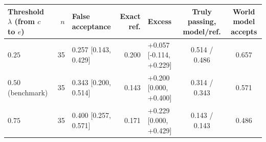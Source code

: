 \setlength{\tabcolsep}{3pt}
\begin{tabular*}{\textwidth}{@{\extracolsep{\fill}}lrlrlcc@{}}
\toprule
Threshold $\lambda$ (from $c$ to $e$) & $n$ & False acceptance & Exact ref. & Excess & Truly passing, model/ref. & World model accepts \\
\midrule
$0.25$ & 35 & 0.257 {\tiny[0.143, 0.429]} & 0.200 & +0.057 {\tiny[\mbox{-}0.114, +0.229]} & 0.514 / 0.486 & 0.657 \\
$0.50$ (benchmark) & 35 & 0.343 {\tiny[0.200, 0.514]} & 0.143 & +0.200 {\tiny[0.000, +0.400]} & 0.314 / 0.343 & 0.571 \\
$0.75$ & 35 & 0.400 {\tiny[0.257, 0.571]} & 0.171 & +0.229 {\tiny[0.000, +0.429]} & 0.143 / 0.143 & 0.486 \\
\bottomrule
\end{tabular*}
